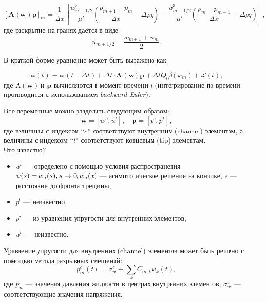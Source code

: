 \documentclass[11pt,a4paper,russian,dvipsnames ]{article}
\begin{document}
\begin{equation}
		[\bm{A}(\bm{w}) \bm{p}]_m =\frac{1}{\Delta x} \left[ \frac{w^3_{m+1/2}}{\mu'} \left( \frac{p_{m+1} - p_m}{\Delta x} - \Delta \rho g \right) - \frac{w^3_{m-1/2}}{\mu'} \left( \frac{p_{m} - p_{m-1}}{\Delta x} - \Delta \rho g \right) \right],
\end{equation}
где раскрытие на гранях даётся в виде 
$$ w_{m \pm 1/2} = \frac{w_{m \pm 1} + w_m}{2}. $$

В краткой форме уравнение может быть выражено как

\begin{equation}\label{eq:lubrication_equation_discretized}
	\bm{w}(t) = \bm{w}(t - \Delta t) + \Delta t \cdot \bm{A}(\bm{w}) \bm{p} + \Delta t Q_0 \delta(x_m) + \mathcal{L}(t),
\end{equation}
где $\bm{A}(\bm{w})$ и $\bm{p}$ вычисляются в момент времени $t$ (интегрирование по времени производится с использованием \emph{backward Euler}).

Все переменные можно разделить следующим образом:
\begin{equation}
	\bm{w} = [w^c, w^t], \quad \bm{p} = [p^c, p^t],
\end{equation}
где величины с индексом ``$c$'' соответствуют внутренним (channel) элементам, а величины с индексом ``$t$'' соответствуют концевым (tip) элементам. \\

\noindent \underline{Что известно?} 
\begin{itemize}\setlength\itemsep{0.1em}
	\item[] $w^t$ --- определено с помощью условия распространения $w(s) = w_a(s), \, s \rightarrow 0, \\ w_a(x)$ --- асимптотическое решение на кончике, $s$ --- расстояние до фронта трещины, 
	\item[] $p^t$ --- неизвестно, 
	\item[] $p^c$ --- из уравнения упругости для внутренних элементов, 
	\item[] $w^c$ --- неизвестно.	
\end{itemize}

Уравнение упругости для внутренних (channel) элементов может быть решено с помощью метода разрывных смещений:
\begin{equation}\label{eq:pw_equation}
	p^c_m(t) = \sigma^c_m + \sum_{k} C_{m,k} w_k(t),	
\end{equation}
где $p^c_m$ --- значения давления жидкости в центрах внутренних элементов, $\sigma^c_m$ --- соответствующие значения напряжения.
\end{document}
